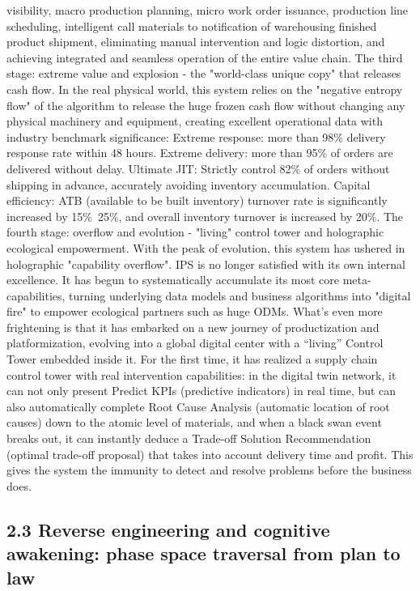 \documentclass[11pt,a4paper]{article}
\begin{document}
visibility, macro production planning, micro work order issuance, production line scheduling, intelligent call materials to notification of warehousing finished product shipment, eliminating manual intervention and logic distortion, and achieving integrated and seamless operation of the entire value chain. The third stage: extreme value and explosion - the "world-class unique copy" that releases cash flow. In the real physical world, this system relies on the "negative entropy flow" of the algorithm to release the huge frozen cash flow without changing any physical machinery and equipment, creating excellent operational data with industry benchmark significance: Extreme response: more than 98\% delivery response rate within 48 hours. Extreme delivery: more than 95\% of orders are delivered without delay. Ultimate JIT: Strictly control 82\% of orders without shipping in advance, accurately avoiding inventory accumulation. Capital efficiency: ATB (available to be built inventory) turnover rate is significantly increased by 15\%~25\%, and overall inventory turnover is increased by 20\%. The fourth stage: overflow and evolution - "living" control tower and holographic ecological empowerment. With the peak of evolution, this system has ushered in holographic "capability overflow". IPS is no longer satisfied with its own internal excellence. It has begun to systematically accumulate its most core meta-capabilities, turning underlying data models and business algorithms into "digital fire" to empower ecological partners such as huge ODMs. What’s even more frightening is that it has embarked on a new journey of productization and platformization, evolving into a global digital center with a “living” Control Tower embedded inside it. For the first time, it has realized a supply chain control tower with real intervention capabilities: in the digital twin network, it can not only present Predict KPIs (predictive indicators) in real time, but can also automatically complete Root Cause Analysis (automatic location of root causes) down to the atomic level of materials, and when a black swan event breaks out, it can instantly deduce a Trade-off Solution Recommendation (optimal trade-off proposal) that takes into account delivery time and profit. This gives the system the immunity to detect and resolve problems before the business does.


\subsection*{2.3 Reverse engineering and cognitive awakening: phase space traversal from plan to law}
\end{document}
